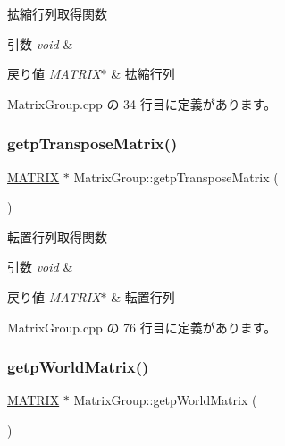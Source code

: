 拡縮行列取得関数 


\begin{DoxyParams}{引数}
{\em void} & \\
\hline
\end{DoxyParams}

\begin{DoxyRetVals}{戻り値}
{\em M\+A\+T\+R\+I\+X$\ast$} & 拡縮行列 \\
\hline
\end{DoxyRetVals}


 Matrix\+Group.\+cpp の 34 行目に定義があります。

\mbox{\label{class_matrix_group_aa800ec499808c1fb2b21e5ad2b824d7d}} 
\subsubsection{\texorpdfstring{getp\+Transpose\+Matrix()}{getpTransposeMatrix()}}
{\footnotesize\ttfamily \mbox{\hyperlink{_matrix_8h_a032295cd9fb1b711757c90667278e744}{M\+A\+T\+R\+IX}} $\ast$ Matrix\+Group\+::getp\+Transpose\+Matrix (\begin{DoxyParamCaption}{ }\end{DoxyParamCaption})}



転置行列取得関数 


\begin{DoxyParams}{引数}
{\em void} & \\
\hline
\end{DoxyParams}

\begin{DoxyRetVals}{戻り値}
{\em M\+A\+T\+R\+I\+X$\ast$} & 転置行列 \\
\hline
\end{DoxyRetVals}


 Matrix\+Group.\+cpp の 76 行目に定義があります。

\mbox{\label{class_matrix_group_adee3cb5fa992dff4f849de3899fc5ce0}} 
\subsubsection{\texorpdfstring{getp\+World\+Matrix()}{getpWorldMatrix()}}
{\footnotesize\ttfamily \mbox{\hyperlink{_matrix_8h_a032295cd9fb1b711757c90667278e744}{M\+A\+T\+R\+IX}} $\ast$ Matrix\+Group\+::getp\+World\+Matrix (\begin{DoxyParamCaption}{ }\end{DoxyParamCaption})}



